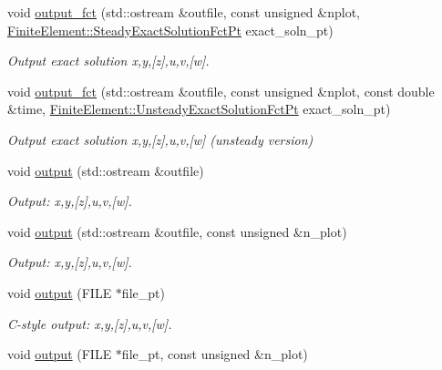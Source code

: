 \begin{DoxyCompactItemize}
void \hyperlink{classoomph_1_1LinearElasticityEquations_a039f66979684d41503f45cdbf87cfc3b}{output\+\_\+fct} (std\+::ostream \&outfile, const unsigned \&nplot, \hyperlink{classoomph_1_1FiniteElement_a690fd33af26cc3e84f39bba6d5a85202}{Finite\+Element\+::\+Steady\+Exact\+Solution\+Fct\+Pt} exact\+\_\+soln\+\_\+pt)
\begin{DoxyCompactList}\small\item\em Output exact solution x,y,\mbox{[}z\mbox{]},u,v,\mbox{[}w\mbox{]}. \end{DoxyCompactList}\item 
void \hyperlink{classoomph_1_1LinearElasticityEquations_af11315d53dcb1e8fe39aef29ccab504a}{output\+\_\+fct} (std\+::ostream \&outfile, const unsigned \&nplot, const double \&time, \hyperlink{classoomph_1_1FiniteElement_ad4ecf2b61b158a4b4d351a60d23c633e}{Finite\+Element\+::\+Unsteady\+Exact\+Solution\+Fct\+Pt} exact\+\_\+soln\+\_\+pt)
\begin{DoxyCompactList}\small\item\em Output exact solution x,y,\mbox{[}z\mbox{]},u,v,\mbox{[}w\mbox{]} (unsteady version) \end{DoxyCompactList}\item 
void \hyperlink{classoomph_1_1LinearElasticityEquations_a43d6b5b646f798329c1d77f64d26cdeb}{output} (std\+::ostream \&outfile)
\begin{DoxyCompactList}\small\item\em Output\+: x,y,\mbox{[}z\mbox{]},u,v,\mbox{[}w\mbox{]}. \end{DoxyCompactList}\item 
void \hyperlink{classoomph_1_1LinearElasticityEquations_ad651870ca4e0f45f7023407656d034ee}{output} (std\+::ostream \&outfile, const unsigned \&n\+\_\+plot)
\begin{DoxyCompactList}\small\item\em Output\+: x,y,\mbox{[}z\mbox{]},u,v,\mbox{[}w\mbox{]}. \end{DoxyCompactList}\item 
void \hyperlink{classoomph_1_1LinearElasticityEquations_a5ece3b89bf886d39782820e449a4edaa}{output} (F\+I\+LE $\ast$file\+\_\+pt)
\begin{DoxyCompactList}\small\item\em C-\/style output\+: x,y,\mbox{[}z\mbox{]},u,v,\mbox{[}w\mbox{]}. \end{DoxyCompactList}\item 
void \hyperlink{classoomph_1_1LinearElasticityEquations_ae48d7ecffb8e3c914a51947b5f79466c}{output} (F\+I\+LE $\ast$file\+\_\+pt, const unsigned \&n\+\_\+plot)

\end{DoxyCompactItemize}
